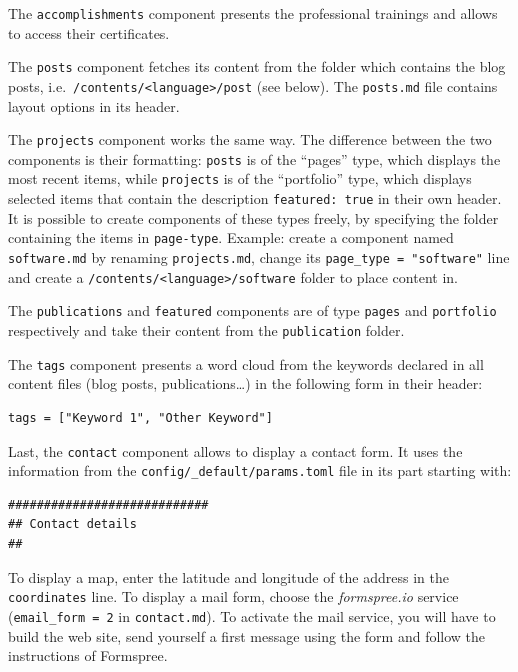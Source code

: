 \documentclass[
  12pt,
  american,
  a4paper,
  extrafontsizes,onecolumn,openright
  ]{memoir}
\begin{document}
\normalsize

The \texttt{accomplishments} component presents the professional trainings and allows to access their certificates.

The \texttt{posts} component fetches its content from the folder which contains the blog posts, i.e.~\texttt{/contents/\textless{}language\textgreater{}/post} (see below).
The \texttt{posts.md} file contains layout options in its header.

The \texttt{projects} component works the same way.
The difference between the two components is their formatting: \texttt{posts} is of the \enquote{pages} type, which displays the most recent items, while \texttt{projects} is of the \enquote{portfolio} type, which displays selected items that contain the description \texttt{featured:\ true} in their own header.
It is possible to create components of these types freely, by specifying the folder containing the items in \texttt{page-type}.
Example: create a component named \texttt{software.md} by renaming \texttt{projects.md}, change its \texttt{page\_type\ =\ "software"} line and create a \texttt{/contents/\textless{}language\textgreater{}/software} folder to place content in.

The \texttt{publications} and \texttt{featured} components are of type \texttt{pages} and \texttt{portfolio} respectively and take their content from the \texttt{publication} folder.

The \texttt{tags} component presents a word cloud from the keywords declared in all content files (blog posts, publications\ldots) in the following form in their header:

\begin{verbatim}
tags = ["Keyword 1", "Other Keyword"]
\end{verbatim}

Last, the \texttt{contact} component allows to display a contact form.
It uses the information from the \texttt{config/\_default/params.toml} file in its part starting with:

\begin{verbatim}
############################
## Contact details
##
\end{verbatim}

To display a map, enter the latitude and longitude of the address in the \texttt{coordinates} line.
To display a mail form, choose the \emph{formspree.io} service (\texttt{email\_form\ =\ 2} in \texttt{contact.md}).
To activate the mail service, you will have to build the web site, send yourself a first message using the form and follow the instructions of Formspree.
\end{document}
